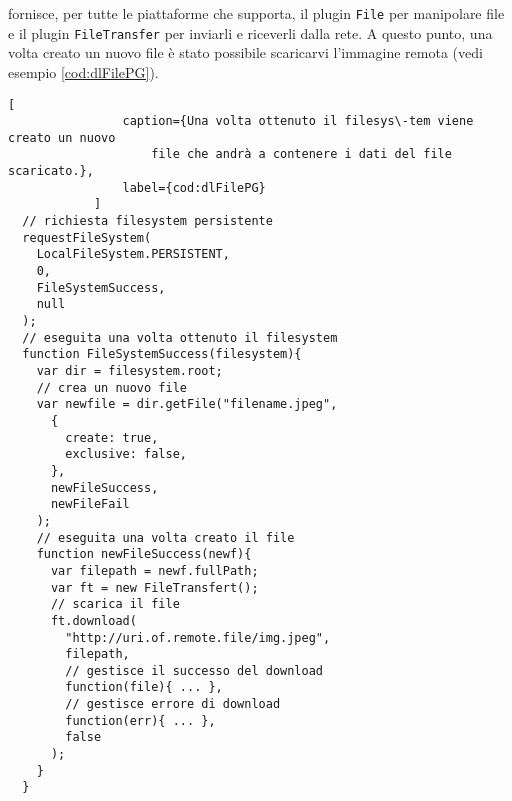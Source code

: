            \pg{} fornisce, per tutte le piattaforme che supporta, il plugin
            \texttt{File} per manipolare file e il plugin \texttt{FileTransfer}
            per inviarli e riceverli dalla rete. A questo punto, una volta
            creato un nuovo file è stato possibile scaricarvi l'immagine remota
            (vedi esempio \ref{cod:dlFilePG}).
            \begin{lstlisting}[
                caption={Una volta ottenuto il filesys\-tem viene creato un nuovo
                    file che andrà a contenere i dati del file scaricato.},
                label={cod:dlFilePG}
            ]
  // richiesta filesystem persistente
  requestFileSystem(
    LocalFileSystem.PERSISTENT,
    0,
    FileSystemSuccess,
    null
  );
  // eseguita una volta ottenuto il filesystem
  function FileSystemSuccess(filesystem){
    var dir = filesystem.root;
    // crea un nuovo file
    var newfile = dir.getFile("filename.jpeg",
      {
        create: true,
        exclusive: false,
      },
      newFileSuccess,
      newFileFail
    );
    // eseguita una volta creato il file
    function newFileSuccess(newf){
      var filepath = newf.fullPath;
      var ft = new FileTransfert();
      // scarica il file
      ft.download(
        "http://uri.of.remote.file/img.jpeg",
        filepath,
        // gestisce il successo del download
        function(file){ ... },
        // gestisce errore di download
        function(err){ ... },
        false
      );
    }
  }
            \end{lstlisting}

